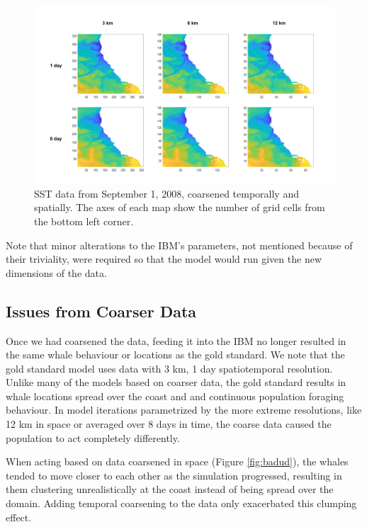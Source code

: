 \documentclass[11pt]{article}
\begin{document}
\begin{figure}[ht] \centering
    \includegraphics[width=6in]{sst_maps.png}
    \caption{SST data from September 1, 2008, coarsened temporally and spatially. The axes of each map show the number of grid cells from the bottom left corner.}
\end{figure}

Note that minor alterations to the IBM’s parameters, not mentioned because of their triviality, were required so that the model would run given the new dimensions of the data. \par

\subsection{Issues from Coarser Data}
Once we had coarsened the data, feeding it into the IBM no longer resulted in the same whale behaviour or locations as the gold standard. We note that the gold standard model uses data with 3 km, 1 day spatiotemporal resolution. Unlike many of the models based on coarser data, the gold standard results in whale locations spread over the coast and and continuous population foraging behaviour. In model iterations parametrized by the more extreme resolutions, like 12 km in space or averaged over 8 days in time, the coarse data caused the population to act completely differently. \par 

When acting based on data coarsened in space (Figure \ref{fig:badud}), the whales tended to move closer to each other as the simulation progressed, resulting in them clustering unrealistically at the coast instead of being spread over the domain. Adding temporal coarsening to the data only exacerbated this clumping effect. \par 
\end{document}
